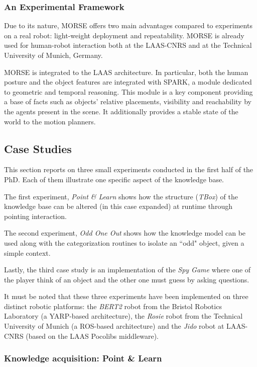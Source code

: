 \subsubsection{An Experimental Framework}

Due to its nature, MORSE offers two main advantages compared to experiments on
a real robot: light-weight deployment and repeatability. MORSE is already used
for human-robot interaction both at the LAAS-CNRS and at the Technical
University of Munich, Germany.

MORSE is integrated to the LAAS architecture.  In particular, both the human
posture and the object features are integrated with SPARK, a
module dedicated to geometric and temporal reasoning.  This module is a key
component providing a base of facts such as objects' relative placements,
visibility and reachability by the agents present in the scene. It additionally
provides a stable state of the world to the motion planners.

\subsection{Case Studies}
\label{sect|casestudies}

This section reports on three small experiments conducted in the first half of
the PhD. Each of them illustrate one specific aspect of the knowledge base.

The first experiment, \emph{Point \& Learn} shows how the structure
(\emph{TBox}) of the knowledge base can be altered (in this case expanded) at
runtime through pointing interaction.

The second experiment, \emph{Odd One Out} shows how the knowledge model can be
used along with the categorization routines to isolate an ``odd" object, given
a simple context.

Lastly, the third case study is an implementation of the \emph{Spy Game} where
one of the player think of an object and the other one must guess by asking
questions.

It must be noted that these three experiments have been implemented on three
distinct robotic platforms: the \textit{BERT2} robot from the Bristol Robotics
Laboratory (a YARP-based architecture), the \textit{Rosie} robot from the
Technical University of Munich (a ROS-based architecture) and the \textit{Jido}
robot at LAAS-CNRS (based on the LAAS Pocolibs middleware).

\subsubsection{Knowledge acquisition: Point \& Learn}
\label{expe|pointandlearn}

